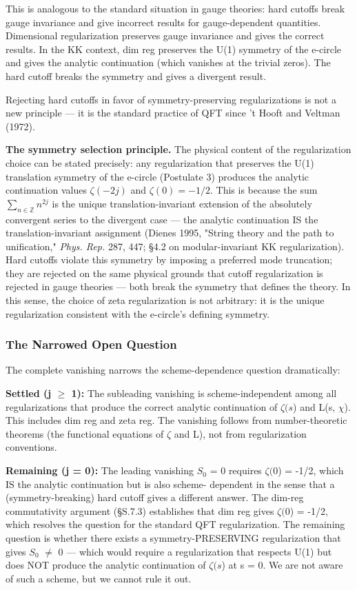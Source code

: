 \documentclass[aps,prd,preprint,superscriptaddress,longbibliography,floatfix]{revtex4-2}
\theoremstyle{remark}
\begin{document}
This is analogous to the standard situation in gauge theories: hard cutoffs break gauge invariance and give incorrect results for gauge-dependent quantities. Dimensional regularization preserves gauge invariance and gives the correct results. In the KK context, dim reg preserves the U(1) symmetry of the e-circle and gives the analytic continuation (which vanishes at the trivial zeros). The hard cutoff breaks the symmetry and gives a divergent result.

Rejecting hard cutoffs in favor of symmetry-preserving regularizations is not a new principle --- it is the standard practice of QFT since 't Hooft and Veltman (1972).

\textbf{The symmetry selection principle.} The physical content of the regularization choice can be stated precisely: any regularization that preserves the U(1) translation symmetry of the e-circle (Postulate 3) produces the analytic continuation values $\zeta(-2j)$ and $\zeta(0) = -1/2$. This is because the sum $\sum_{n\in\mathbb{Z}} n^{2j}$ is the unique translation-invariant extension of the absolutely convergent series to the divergent case --- the analytic continuation IS the translation-invariant assignment (Dienes 1995, "String theory and the path to unification," \textit{Phys. Rep.} 287, 447; \S{}4.2 on modular-invariant KK regularization). Hard cutoffs violate this symmetry by imposing a preferred mode truncation; they are rejected on the same physical grounds that cutoff regularization is rejected in gauge theories --- both break the symmetry that defines the theory. In this sense, the choice of zeta regularization is not arbitrary: it is the unique regularization consistent with the e-circle's defining symmetry.


\subsubsection{The Narrowed Open Question}

The complete vanishing narrows the scheme-dependence question dramatically:

\textbf{Settled (j $\geq$ 1):} The subleading vanishing is scheme-independent among all regularizations that produce the correct analytic continuation of $\zeta(s$) and L(s, $\chi$). This includes dim reg and zeta reg. The vanishing follows from number-theoretic theorems (the functional equations of $\zeta$ and L), not from regularization conventions.

\textbf{Remaining (j = 0):} The leading vanishing $S_{0}$ = 0 requires $\zeta(0$) = -1/2, which IS the analytic continuation but is also scheme- dependent in the sense that a (symmetry-breaking) hard cutoff gives a different answer. The dim-reg commutativity argument (\S{}S.7.3) establishes that dim reg gives $\zeta(0$) = -1/2, which resolves the question for the standard QFT regularization. The remaining question is whether there exists a symmetry-PRESERVING regularization that gives $S_{0}$ $\neq$ 0 --- which would require a regularization that respects U(1) but does NOT produce the analytic continuation of $\zeta(s$) at s = 0. We are not aware of such a scheme, but we cannot rule it out.
\end{document}
